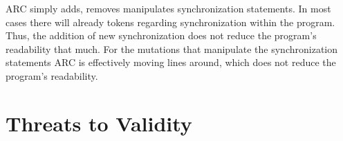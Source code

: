 \documentclass{llncs}
\begin{document}
ARC simply adds, removes manipulates synchronization statements. In most cases
there will already tokens regarding synchronization within the program. Thus,
the addition of new synchronization does not reduce the program's readability
that much. For the mutations that manipulate the synchronization statements ARC
is effectively moving lines around, which does not reduce the program's
readability.



\section{Threats to Validity}
\label{sec:threats}
\end{document}
